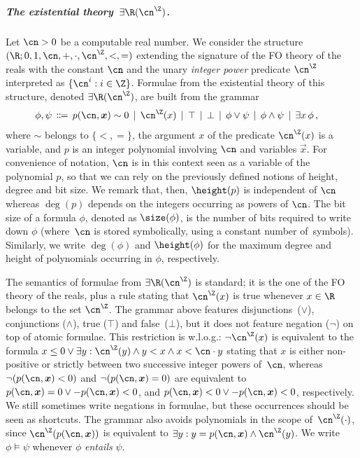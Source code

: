 \subparagraph*{The existential theory~$\exists\R(\ipow{\cn})$.}
Let $\cn > 0$ be a computable real number. We consider the structure $(\R; 0, 1,
\cn, +, \cdot, \ipow{\cn}, <,=)$ extending the signature of the FO theory of the
reals with the constant $\cn$ and the unary \emph{integer power} predicate
$\ipow{\cn}$ interpreted as $\{ \cn^{i} : i \in \Z \}$. Formulae from the
existential theory of this structure, denoted $\exists \R(\ipow{\cn})$, are
built from the grammar
\begin{align*} 
  \phi,\psi &\,\Coloneqq\,  p(\cn,\vec x) \sim 0  \,\mid\, \ipow{\cn}(x) \,\mid\, \top \,\mid\, \bot \,\mid\, \phi \lor \psi \,\mid\, \phi \land \psi \,\mid\, \exists x \, \phi \,,
\end{align*}
where $\sim$ belongs to $\{<,=\}$,  the argument $x$ of the predicate
$\ipow{\cn}(x)$ is a variable, and $p$ is an integer polynomial involving $\cn$
and variables $\vec{x}$. For convenience of notation, $\cn$ is in this context
seen as a variable of the polynomial $p$, so that we can rely on the previously
defined notions of height, degree and bit size. We remark that, then, $\height(p)$
is independent of $\cn$ whereas $\deg(p)$ depends on the integers occurring as
powers of $\cn$. The bit size of a formula $\phi$, denoted as $\size(\phi)$, is
the number of bits required to write down $\phi$ (where~$\cn$ is stored
symbolically, using a constant number of~symbols). Similarly, we write
$\deg(\phi)$ and $\height(\phi)$ for the maximum degree and height of
polynomials occurring in $\phi$, respectively.


The semantics of formulae from $\exists \R(\ipow{\cn})$ is standard; 
it is the one of the FO theory of the reals, plus a rule stating
that $\ipow{\cn}(x)$ is true whenever $x \in \R$ belongs to the set $\ipow{\cn}$.
The grammar above features disjunctions~($\lor$), conjunctions ($\land$), true
($\top$) and false~($\bot$), but it does not feature negation ($\lnot$) on top
of atomic formulae. 
This restriction is w.l.o.g.: $\lnot \ipow{\cn}(x)$ is
equivalent to the formula $x \leq 0 \lor \exists y : \ipow{\cn}(y) \land y < x
\land x < \cn \cdot y$ stating that $x$ is either non-positive or strictly
between two successive integer powers of~$\cn$, whereas $\lnot (p(\cn,\vec x) <
0)$ and $\lnot (p(\cn,\vec x) = 0)$ are equivalent to $p(\cn, \vec x) = 0 \lor
-p(\cn,\vec x) < 0$, and $p(\cn,\vec x) < 0 \lor -p(\cn,\vec x) < 0$,
respectively. We still sometimes write negations in formulae, but these
occurrences should be seen as shortcuts. The grammar also avoids polynomials in
the scope of~$\ipow{\cn}(\cdot)$, since
$\ipow{\cn}(p(\cn,\vec{x}))$ is equivalent to $\exists y : y = p(\cn,\vec{x})
\land \ipow{\cn}(y)$. We write $\phi \models \psi$ whenever $\phi$
\emph{entails} $\psi$.

